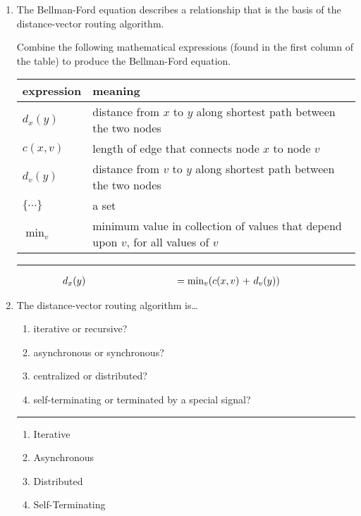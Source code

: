 \documentclass[twoside]{article}
\newenvironment{answer}
  {\vspace*{0.2cm} \rule{12cm}{0.04cm} \vspace*{0.2cm}}
  {\vspace*{0.2cm}}
\begin{document}
\begin{enumerate}
\begin{answer}
    \end{answer}

  \item The Bellman-Ford equation describes a relationship that
    is the basis of the distance-vector routing algorithm.

    Combine the following mathematical expressions
    (found in the first column of the table) to produce the Bellman-Ford equation.

  \begin{tabular}{ll}
    \textbf{expression} & \textbf{meaning} \\ \hline
    $d_x(y)$ & distance from $x$ to $y$ along shortest path between the two nodes\\
    $c(x,v)$ & length of edge that connects node $x$ to node $v$ \\
    $d_v(y)$ & distance from $v$ to $y$ along shortest path between the two nodes \\
    $\{ \cdots \}$ & a set \\
    ${\min}_v$ & \parbox[t]{10cm}{minimum value in collection of values that
      depend upon $v$, for all values of $v$}
    \end{tabular}

  \begin{answer}

  \begin{align*}
    \parbox{4cm}{$d_x(y)$} & = \parbox{4cm}{${\min}_v$($c(x,v)$ + $d_v(y)$)}
    \end{align*}

    \end{answer}

  \item The distance-vector routing algorithm is\ldots
  \begin{enumerate}
    \item iterative or recursive?
    \item asynchronous or synchronous?
    \item centralized or distributed?
    \item self-terminating or terminated by a special signal?
    \end{enumerate}

  \begin{answer}

  \begin{enumerate}
    \item Iterative
    \item Asynchronous
    \item Distributed
    \item Self-Terminating
    \end{enumerate}


\end{answer}
\end{enumerate}
\end{document}
